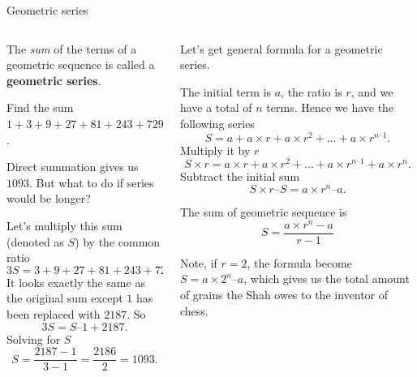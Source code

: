 \documentclass[9pt,aspectratio=169]{beamer}
\begin{document}
\begin{frame}{Geometric series}
  \begin{columns}[T]
    \begin{column}{0.5\textwidth}
      \begin{definition}
        The \emph{sum} of the terms of a geometric sequence is called a \textbf{geometric series}.
      \end{definition}
      \begin{problem}
        Find the sum $1 + 3 + 9 + 27 + 81 + 243 + 729$.
      \end{problem}

      Direct summation gives us $1093$. But what to do if series would be longer?

      Let’s multiply this sum (denoted as $S$) by the common ratio
      \[ 3S = 3 + 9 + 27 + 81 + 243 + 729 + 2187. \]
      It looks exactly the same as the original sum except $1$ has been replaced with $2187$.  So 
      \[ 3S = S – 1 + 2187. \]
      Solving for $S$
      \[ S = \frac{2187 - 1}{3 - 1} = \frac{2186}{2} = 1093. \]
    \end{column}
    \begin{column}{0.5\textwidth}
      Let’s get general formula for a geometric series.
      
      The initial term is $a$, the ratio is $r$, and we have a total of $n$ terms. Hence we have the following series
      \[ S = a + a \times r + a \times r^2 + \ldots + a \times r^{n–1}. \]Multiply it by $r$
      \[ S \times r = a \times r + a \times r^2 + \ldots + a \times r^{n–1} + a \times r^n. \]
      Subtract the initial sum
      \[ S \times r – S = a \times r^n – a. \]
      \vspace*{-1em}
      \begin{definition}
        The sum of geometric sequence is
        \[ S = \frac{a \times r^n - a}{r - 1}\]
        \vspace*{-0.7em}
      \end{definition}
      Note, if $r = 2$, the formula become $S = a \times 2^n – a$, which gives us the total amount of grains the Shah owes to the inventor of chess.
    \end{column}
  \end{columns}
\end{frame}
\end{document}
